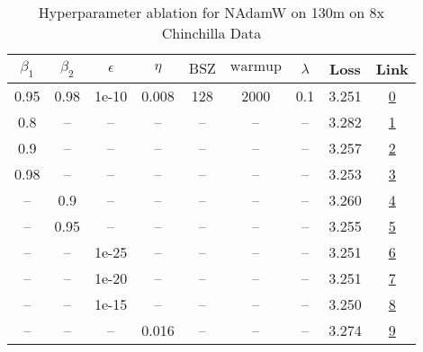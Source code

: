 \begin{table}[H]
\centering
\caption{Hyperparameter ablation for NAdamW on 130m on 8x Chinchilla Data}
\label{tab:ablation_nadamw_130m_8}
\begin{tabular}{ccccccccc}
\toprule
$\beta_1$ & $\beta_2$ & $\epsilon$ & $\eta$ & $\mathrm{BSZ}$ & $\mathrm{warmup}$ & $\lambda$ & Loss & Link \\
\midrule
0.95 & 0.98 & 1e-10 & 0.008 & 128 & 2000 & 0.1 & 3.251 & \href{https://wandb.ai/stanford-mercury/optimizer-scaling/runs/sweep-130m-21B-nadamw6383f8lr0.008-wd0.1-minlr0-warmup2000-b10.9-044a64}{0} \\
\midrule
0.8 & -- & -- & -- & -- & -- & -- & 3.282 & \href{https://wandb.ai/stanford-mercury/optimizer-scaling/runs/sweep-130m-21B-nadamwc92c72lr0.008-wd0.1-minlr0-warmup2000-b10.8-2c8117}{1} \\
0.9 & -- & -- & -- & -- & -- & -- & 3.257 & \href{https://wandb.ai/stanford-mercury/optimizer-scaling/runs/sweep-130m-21B-nadamwb1139dlr0.008-wd0.1-minlr0-warmup2000-b10.9-a22589}{2} \\
0.98 & -- & -- & -- & -- & -- & -- & 3.253 & \href{https://wandb.ai/stanford-mercury/optimizer-scaling/runs/sweep-130m-21B-nadamw532224lr0.008-wd0.1-minlr0-warmup2000-b10.9-a9e22e}{3} \\
-- & 0.9 & -- & -- & -- & -- & -- & 3.260 & \href{https://wandb.ai/stanford-mercury/optimizer-scaling/runs/sweep-130m-21B-nadamwebc3a7lr0.008-wd0.1-minlr0-warmup2000-b10.9-2d9521}{4} \\
-- & 0.95 & -- & -- & -- & -- & -- & 3.255 & \href{https://wandb.ai/stanford-mercury/optimizer-scaling/runs/sweep-130m-21B-nadamw6a5715lr0.008-wd0.1-minlr0-warmup2000-b10.9-c46dee}{5} \\
-- & -- & 1e-25 & -- & -- & -- & -- & 3.251 & \href{https://wandb.ai/stanford-mercury/optimizer-scaling/runs/sweep-130m-21B-nadamw47eb94lr0.008-wd0.1-minlr0-warmup2000-b10.9-d49c15}{6} \\
-- & -- & 1e-20 & -- & -- & -- & -- & 3.251 & \href{https://wandb.ai/stanford-mercury/optimizer-scaling/runs/sweep-130m-21B-nadamwf3b7d9lr0.008-wd0.1-minlr0-warmup2000-b10.9-0f4c2b}{7} \\
-- & -- & 1e-15 & -- & -- & -- & -- & 3.250 & \href{https://wandb.ai/stanford-mercury/optimizer-scaling/runs/sweep-130m-21B-nadamw532daalr0.008-wd0.1-minlr0-warmup2000-b10.9-18ddc4}{8} \\
-- & -- & -- & 0.016 & -- & -- & -- & 3.274 & \href{https://wandb.ai/stanford-mercury/optimizer-scaling/runs/sweep-130m-21B-nadamwa4d8belr0.016-wd0.1-minlr0-warmup2000-b10.9-d5c520}{9} \\

\end{tabular}
\end{table}
